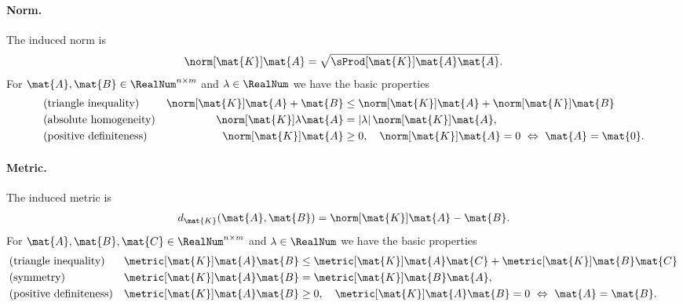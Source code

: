 \paragraph{Norm.}
The induced norm is
\begin{align}
 \norm[\mat{K}]{\mat{A}} = \sqrt{\sProd[\mat{K}]{\mat{A}}{\mat{A}}}.
\end{align}
For $\mat{A}, \mat{B} \in \RealNum^{n\times m}$ and $\lambda \in \RealNum$ we have the basic properties
\begin{subequations}
\begin{align}
 &\text{(triangle inequality)}&
 \norm[\mat{K}]{\mat{A}+\mat{B}} &\leq \norm[\mat{K}]{\mat{A}} + \norm[\mat{K}]{\mat{B}}
\\
 &\text{(absolute homogeneity)}&
 \norm[\mat{K}]{\lambda \mat{A}} &= |\lambda| \, \norm[\mat{K}]{\mat{A}},
\\
 &\text{(positive definiteness)}&
 \norm[\mat{K}]{\mat{A}} &\geq 0, \quad \norm[\mat{K}]{\mat{A}} = 0 \ \Leftrightarrow \ \mat{A} = \mat{0}.
\end{align}
\end{subequations}

\paragraph{Metric.}
The induced metric is
\begin{align}
 d_{\mat{K}}(\mat{A}, \mat{B}) = \norm[\mat{K}]{\mat{A}-\mat{B}}.
\end{align}
For $\mat{A}, \mat{B}, \mat{C} \in \RealNum^{n\times m}$ and $\lambda \in \RealNum$ we have the basic properties
\begin{subequations}
\begin{align}
 &\text{(triangle inequality)}&
 \metric[\mat{K}]{\mat{A}}{\mat{B}} &\leq \metric[\mat{K}]{\mat{A}}{\mat{C}} + \metric[\mat{K}]{\mat{B}}{\mat{C}}
\\
 &\text{(symmetry)}&
 \metric[\mat{K}]{\mat{A}}{\mat{B}} &= \metric[\mat{K}]{\mat{B}}{\mat{A}},
\\
 &\text{(positive definiteness)}&
 \metric[\mat{K}]{\mat{A}}{\mat{B}} &\geq 0, \quad \metric[\mat{K}]{\mat{A}}{\mat{B}} = 0 \ \Leftrightarrow \ \mat{A} = \mat{B}.
\end{align}
\end{subequations}

